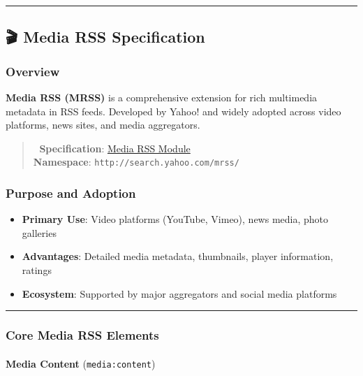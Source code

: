 \documentclass[
  letterpaper,
  DIV=11,
  numbers=noendperiod]{scrartcl}
\makeatletter
\let\oldparagraph\paragraph
\renewcommand{\paragraph}{
    \@ifstar
      \xxxParagraphStar
      \xxxParagraphNoStar
  }
\newcommand{\xxxParagraphStar}[1]{\oldparagraph*{#1}\mbox{}}
\newcommand{\xxxParagraphNoStar}[1]{\oldparagraph{#1}\mbox{}}
\providecommand{\tightlist}{%
  \setlength{\itemsep}{0pt}\setlength{\parskip}{0pt}}\usepackage{longtable,booktabs,array}
\makeatother
\begin{document}
\begin{center}\rule{0.5\linewidth}{0.5pt}\end{center}

\subsection{🎬 Media RSS Specification}\label{media-rss-specification}

\subsubsection{Overview}\label{overview-1}

\textbf{Media RSS (MRSS)} is a comprehensive extension for rich
multimedia metadata in RSS feeds. Developed by Yahoo! and widely adopted
across video platforms, news sites, and media aggregators.

\begin{quote}
📄 \textbf{Specification}:
\href{http://www.rssboard.org/media-rss}{Media RSS Module}\\
\textbf{Namespace}: \texttt{http://search.yahoo.com/mrss/}
\end{quote}

\subsubsection{Purpose and Adoption}\label{purpose-and-adoption}

\begin{itemize}
\tightlist
\item
  \textbf{Primary Use}: Video platforms (YouTube, Vimeo), news media,
  photo galleries
\item
  \textbf{Advantages}: Detailed media metadata, thumbnails, player
  information, ratings
\item
  \textbf{Ecosystem}: Supported by major aggregators and social media
  platforms
\end{itemize}

\begin{center}\rule{0.5\linewidth}{0.5pt}\end{center}

\subsubsection{Core Media RSS Elements}\label{core-media-rss-elements}

\paragraph{\texorpdfstring{\textbf{Media Content}
(\texttt{media:content})}{Media Content (media:content)}}\label{media-content-mediacontent}
\end{document}
